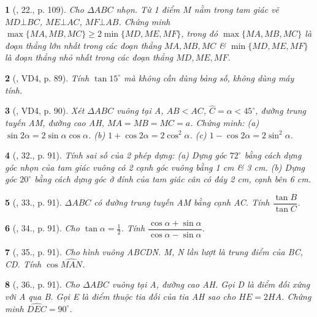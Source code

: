 \documentclass{article}
\newtheorem{baitoan}{}
\begin{document}
\begin{baitoan}[\cite{Tuyen_Toan_9_old}, 22., p. 109]
	Cho $\Delta ABC$ nhọn. Từ 1 điểm $M$ nằm trong tam giác vẽ $MD\bot BC$, $ME\bot AC$, $MF\bot AB$. Chứng minh $\max\{MA,MB,MC\}\ge2\min\{MD,ME,MF\}$, trong đó $\max\{MA,MB,MC\}$ là đoạn thẳng lớn nhất trong các đoạn thẳng $MA,MB,MC$ \& $\min\{MD,ME,MF\}$ là đoạn thẳng nhỏ nhất trong các đoạn thẳng $MD,ME,MF$.
\end{baitoan}

\begin{baitoan}[\cite{Binh_Toan_9_tap_1}, VD4, p. 89]
	Tính $\tan15^\circ$ mà không cần dùng bảng số, không dùng máy tính.
\end{baitoan}

\begin{baitoan}[\cite{Binh_Toan_9_tap_1}, VD4, p. 90]
	Xét $\Delta ABC$ vuông tại A, $AB < AC$, $\widehat{C} = \alpha  < 45^\circ$, đường trung tuyến AM, đường cao AH, $MA = MB = MC = a$. Chứng minh: (a) $\sin2\alpha = 2\sin\alpha\cos\alpha$. (b) $1 + \cos2\alpha = 2\cos^2\alpha$. (c) $1 - \cos2\alpha = 2\sin^2\alpha$.
\end{baitoan}

\begin{baitoan}[\cite{Binh_Toan_9_tap_1}, 32., p. 91]
	Tính sai số của 2 phép dựng: (a) Dựng góc $72^\circ$ bằng cách dựng góc nhọn của tam giác vuông có 2 cạnh góc vuông bằng {\rm1 cm} \& {\rm3 cm}. (b) Dựng góc $20^\circ$ bằng cách dựng góc ở đỉnh của tam giác cân có đáy {\rm2 cm}, cạnh bên {\rm6 cm}.
\end{baitoan}

\begin{baitoan}[\cite{Binh_Toan_9_tap_1}, 33., p. 91]
	$\Delta ABC$ có đường trung tuyến AM bằng cạnh AC. Tính $\dfrac{\tan B}{\tan C}$.
\end{baitoan}

\begin{baitoan}[\cite{Binh_Toan_9_tap_1}, 34., p. 91]
	Cho $\tan\alpha = \frac{1}{2}$. Tính $\dfrac{\cos\alpha + \sin\alpha}{\cos\alpha - \sin\alpha}$.
\end{baitoan}

\begin{baitoan}[\cite{Binh_Toan_9_tap_1}, 35., p. 91]
	Cho hình vuông ABCDN. M, N lần lượt là trung điểm của BC, CD. Tính $\cos\widehat{MAN}$.
\end{baitoan}

\begin{baitoan}[\cite{Binh_Toan_9_tap_1}, 36., p. 91]
	Cho $\Delta ABC$ vuông tại A, đường cao AH. Gọi D là điểm đối xứng với A qua B. Gọi E là điểm thuộc tia đối của tia AH sao cho $HE = 2HA$. Chứng minh $\widehat{DEC} = 90^\circ$.
\end{baitoan}
\end{document}
